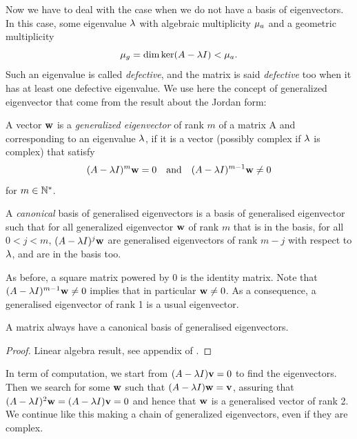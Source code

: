 Now we have to deal with the case when we do not have a basis of eigenvectors. In this case, some eigenvalue $\lambda$ with algebraic multiplicity $\mu_a$ and a geometric multiplicity
$$\mu_g=\dim\ker(A-\lambda I) < \mu_a.$$
Such an eigenvalue is called \emph{defective}, and the matrix is said \emph{defective} too when it has at least one defective eigenvalue. We use here the concept of generalized eigenvector that come from the result about the Jordan form:

\begin{definition}
    A vector $\mathbf{w}$ is a \emph{generalized eigenvector} of rank $m$  of a matrix A and corresponding to an eigenvalue $\lambda$, if it is a vector (possibly complex if $\lambda$ is complex) that satisfy
    $$(A-\lambda I)^m\mathbf{w}=0 \quad\text{and}\quad (A-\lambda I)^{m-1}\mathbf{w}\neq0$$
    for $m\in\mathbb{N}^*$.
    
    A \emph{canonical} basis of generalised eigenvectors is a basis of generalised eigenvector such that for all generalized eigenvector $\mathbf{w}$ of rank $m$ that is in the basis, for all $0<j<m$, $(A-\lambda I)^j\mathbf{w}$ are generalised eigenvectors of rank $m-j$ with respect to $\lambda$, and are in the basis too.
\end{definition}

\begin{remarque}
As before, a square matrix powered by 0 is the identity matrix. Note that $(A-\lambda I)^{m-1}\mathbf{w}\neq0$ implies that in particular $\mathbf{w}\neq0$. As a consequence, a generalised eigenvector of rank 1 is a usual eigenvector.
\end{remarque}
    
\begin{theoreme}
    A matrix always have a canonical basis of generalised eigenvectors.
\end{theoreme}
\begin{proof}
    Linear algebra result, see appendix of \cite{Hir}.
\end{proof}

In term of computation, we start from $(A-\lambda I)\mathbf{v}=0$ to find the eigenvectors. Then we search for some $\mathbf{w}$ such that $(A-\lambda I)\mathbf{w}=\mathbf{v}$, assuring that $(A-\lambda I)^2\mathbf{w}=(A-\lambda I)\mathbf{v}=0$ and hence that $\mathbf{w}$ is a generalised vector of rank 2. We continue like this making a chain of generalized eigenvectors, even if they are complex.

